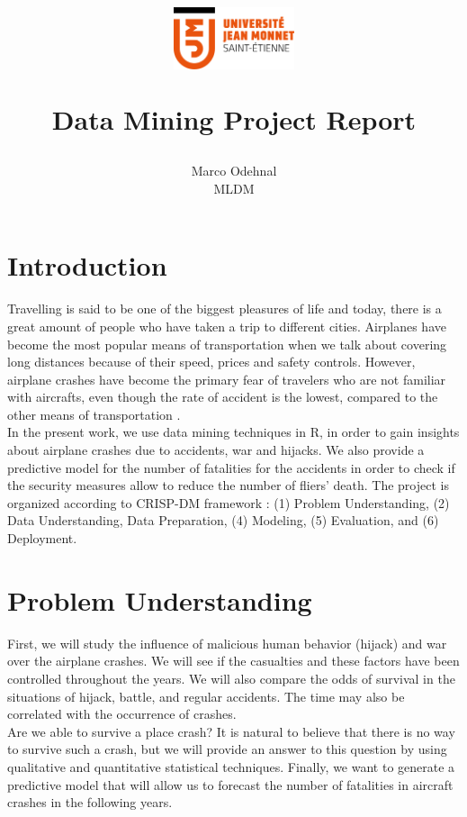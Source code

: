 \documentclass[12pt]{article}
\title{
\vspace{-30mm}\begin{figure}[h]
\centering
\includegraphics[width=1.4in]{logoUJM}
\label{escudo}
\end{figure}Data Mining Project Report}
\author{Marco Odehnal\\MLDM}
\begin{document}

	
\maketitle
\section*{Introduction}
\par{Travelling is said to be one of the biggest pleasures of life and today, there is a great amount of people who have taken a trip to different cities. Airplanes have become the most popular means of transportation when we talk about covering long distances because of their speed, prices and safety controls. However, airplane crashes have become the primary fear of travelers who are not familiar with aircrafts, even though the rate of accident is the lowest, compared to the other means of transportation \cite{bib:crashtransport}.}\\

In the present work, we use data mining techniques in R, in order to gain insights about airplane crashes due to accidents, war and hijacks. We also provide a predictive model for the number of fatalities for the accidents in order to check if the security measures allow to reduce the number of fliers' death. The project is organized according to CRISP-DM framework \cite{bib:crisp}: (1) Problem Understanding, (2) Data Understanding, Data Preparation, (4) Modeling, (5) Evaluation, and (6) Deployment.

\section{Problem Understanding}
First, we will study the influence of malicious human behavior (hijack) and war over the airplane crashes. We will see if the casualties and these factors have been controlled throughout the years. We will also compare the odds of survival in the situations of hijack, battle, and regular accidents. The time may also be correlated with the occurrence of crashes.\\

Are we able to survive a place crash? It is natural to believe that there is no way to survive such a crash, but we will provide an answer to this question by using qualitative and quantitative statistical techniques. Finally, we want to generate a predictive model that will allow us to forecast the number of fatalities in aircraft crashes in the following years. 
\end{document}
